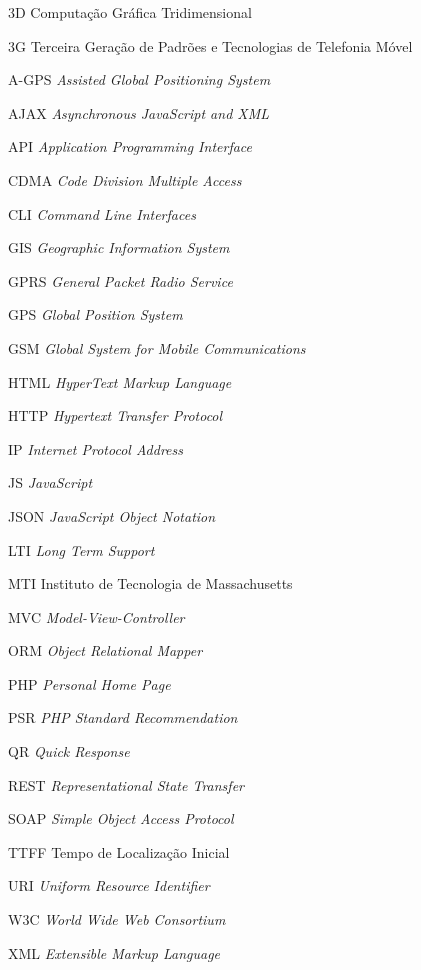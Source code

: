 
\begin{siglas}
    \item[3D] Computação Gráfica Tridimensional
    \item[3G] Terceira Geração de Padrões e Tecnologias de Telefonia Móvel
    \item[A-GPS] \textit{Assisted Global Positioning System}
    \item[AJAX] \textit{Asynchronous JavaScript and XML}
    \item[API] \textit{Application Programming Interface}
    \item[CDMA] \textit{Code Division Multiple Access}
    \item[CLI] \textit{Command Line Interfaces}
    \item[GIS] \textit{Geographic Information System}
    \item[GPRS] \textit{General Packet Radio Service}
    \item[GPS] \textit{Global Position System}
    \item[GSM] \textit{Global System for Mobile Communications}
    \item[HTML] \textit{HyperText Markup Language}
    \item[HTTP] \textit{Hypertext Transfer Protocol}
    \item[IP] \textit{Internet Protocol Address}
    \item[JS] \textit{JavaScript}
    \item[JSON] \textit{JavaScript Object Notation}
    \item[LTI] \textit{Long Term Support}
    \item[MTI] Instituto de Tecnologia de Massachusetts
    \item[MVC] \textit{Model-View-Controller}
    \item[ORM] \textit{Object Relational Mapper}
    \item[PHP] \textit{Personal Home Page}
    \item[PSR] \textit{PHP Standard Recommendation}
    \item[QR] \textit{Quick Response}
    \item[REST] \textit{Representational State Transfer}
    \item[SOAP] \textit{Simple Object Access Protocol}
    \item[TTFF] Tempo de Localização Inicial
    \item[URI] \textit{Uniform Resource Identifier}
    \item[W3C] \textit{World Wide Web Consortium}
    \item[XML] \textit{Extensible Markup Language}
\end{siglas}

